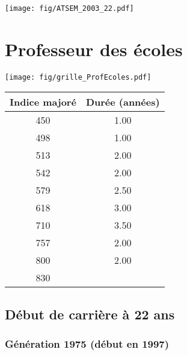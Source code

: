  \vspace{0.1cm} 

 \begin{center}\texttt{[image: fig/ATSEM\_2003\_22.pdf]}\end{center} \label{fig/ATSEM_2003_22.pdf} 

\newpage 
 
\chapter{Professeur des écoles} 

\begin{minipage}{0.55\linewidth}\texttt{[image: fig/grille\_ProfEcoles.pdf]}\end{minipage} 
\begin{minipage}{0.3\linewidth} 
 \begin{center} 

\begin{tabular}[htb]{|c|c|} 
\hline 
 Indice majoré &  Durée (années) \\ 
\hline \hline 
 450 &  1.00 \\ 
\hline 
 498 &  1.00 \\ 
\hline 
 513 &  2.00 \\ 
\hline 
 542 &  2.00 \\ 
\hline 
 579 &  2.50 \\ 
\hline 
 618 &  3.00 \\ 
\hline 
 710 &  3.50 \\ 
\hline 
 757 &  2.00 \\ 
\hline 
 800 &  2.00 \\ 
\hline 
 830 &   \\ 
\hline 
\hline 
\end{tabular} 
\end{center} 
 \end{minipage} 


 \addto{\captionsenglish}{ \renewcommand{\mtctitle}{}} \setcounter{minitocdepth}{2} 
 \minitoc \newpage 

\section{Début de carrière à 22 ans} 

\subsection{Génération 1975 (début en 1997)} 

